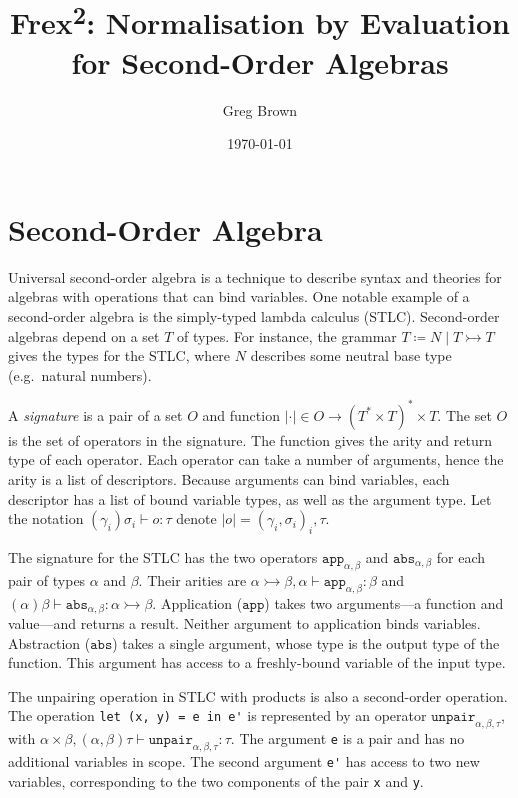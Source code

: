 \documentclass[11pt,a4paper]{article}
\author{Greg Brown}
\date{\today}
\title{Frex\textsuperscript{2}: Normalisation by Evaluation for Second-Order Algebras}
\newcommand*\tarr[2]{\ensuremath{{#1} \rightarrowtail {#2}}}
\newcommand*\ctxcons[2]{{#1}, {#2}}
\begin{document}
\maketitle

\section{Second-Order Algebra}

Universal second-order algebra is a technique to describe syntax and theories
for algebras with operations that can bind variables. One notable example of a
second-order algebra is the simply-typed lambda calculus (STLC). Second-order
algebras depend on a set \(T\) of types. For instance, the grammar \(T \coloneqq
{N \mid \tarr{T}{T}}\) gives the types for the STLC, where \(N\) describes some
neutral base type (e.g.\ natural numbers).

A \emph{signature} is a pair of a set \(O\) and function \({\vert\cdot\vert} \in {O \to
{{(T^* \times T)}^* \times T}}\). The set \(O\) is the set of operators in the signature.
The function gives the arity and return type of each operator. Each operator can
take a number of arguments, hence the arity is a list of descriptors. Because
arguments can bind variables, each descriptor has a list of bound variable
types, as well as the argument type. Let the notation \((\gamma_i)\sigma_i \vdash o : \tau\)
denote \({\vert o \vert} = {{(\gamma_i , \sigma_i)}_i , \tau}\).

The signature for the STLC has the two operators \(\mathtt{app}_{\alpha,\beta}\) and
\(\mathtt{abs}_{\alpha,\beta}\) for each pair of types \(\alpha\) and \(\beta\). Their arities are
\({\ctxcons{\tarr{\alpha}{\beta}}{\alpha}} \vdash \mathtt{app}_{\alpha,\beta} : \beta\) and \({(\alpha)\beta} \vdash
\mathtt{abs}_{\alpha,\beta} : \tarr{\alpha}{\beta}\).  Application (\(\mathtt{app}\)) takes two
arguments---a function and value---and returns a result. Neither argument to
application binds variables.  Abstraction (\(\mathtt{abs}\)) takes a single
argument, whose type is the output type of the function. This argument has
access to a freshly-bound variable of the input type.

The unpairing operation in STLC with products is also a second-order operation.
The operation \verb|let (x, y) = e in e'| is represented by an operator
\(\mathtt{unpair}_{\alpha,\beta,\tau}\), with \({\ctxcons{\alpha \times \beta}{(\ctxcons{\alpha}{\beta})\tau}} \vdash
\mathtt{unpair}_{\alpha,\beta,\tau} : \tau\). The argument \verb|e| is a pair and has no
additional variables in scope. The second argument \verb|e'| has access to two
new variables, corresponding to the two components of the pair \verb|x| and
\verb|y|\footnotemark.
\end{document}
